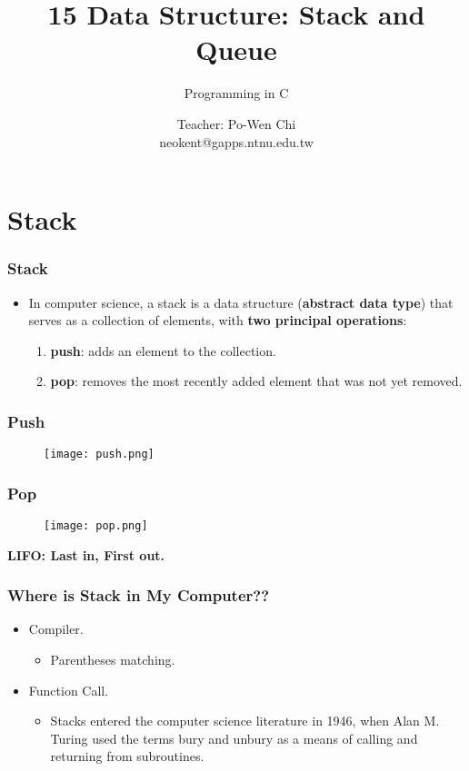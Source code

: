 \documentclass[11pt]{beamer}
\title{\vspace{1.5em} 15 Data Structure: Stack and Queue}
\subtitle{Programming in C}
\author{\large{Teacher: Po-Wen Chi}\\neokent@gapps.ntnu.edu.tw}
\institute{
        \small{Department of Computer Science and Information Engineering,\\
                National Taiwan Normal University} }
\begin{document}
\maketitle

\section{Stack}

\begin{frame}
\frametitle{Stack}
\begin{itemize}
\item In computer science, a stack is a data structure ({\color{red}\bf abstract data type}) that serves as {\color{blue}a collection of elements}, with {\bf\color{magenta}two principal operations}:
    \begin{enumerate}
    \item {\bf push}:  adds an element to the collection.
    \item {\bf pop}: removes {\color{purple}the most recently added element} that was not yet removed.
    \end{enumerate}
\end{itemize}
\end{frame}

\begin{frame}
\frametitle{Push}
\begin{figure}
\centering
\texttt{[image: push.png]}
\end{figure}
\end{frame}

\begin{frame}
\frametitle{Pop}
\begin{figure}
\centering
\texttt{[image: pop.png]}
\end{figure}
\end{frame}

\begin{frame}
\begin{center}
\LARGE \bf \color{purple} 
LIFO: Last in, First out.
\end{center}
\end{frame}

\begin{frame}
\frametitle{Where is Stack in My Computer??}
\begin{itemize}
\item Compiler.
    \begin{itemize}
    \item Parentheses matching.
    \end{itemize}    
\item Function Call.
    \begin{itemize}
    \item Stacks entered the computer science literature in 1946, when {\color{blue}Alan M. Turing} used the terms {\color{red} bury} and {\color{red} unbury} as a means of calling and returning from subroutines.
    \end{itemize}
\end{itemize}
\end{frame}
\end{document}
